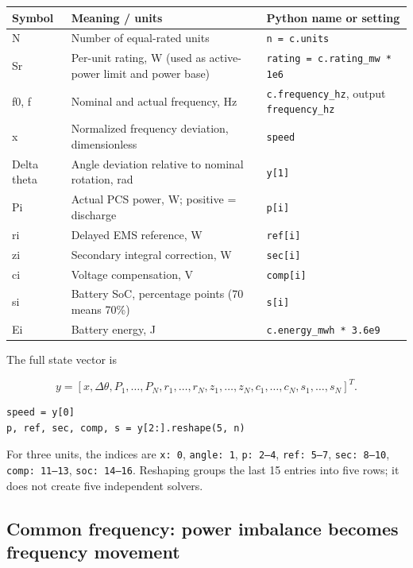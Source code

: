 \documentclass[11pt,a4paper]{article}
\begin{document}
\begingroup\small
\setlength{\tabcolsep}{3pt}
\begin{longtable}{p{}p{}p{}}
\toprule
Symbol & Meaning / units & Python name or setting \\
\midrule\endhead
N & Number of equal-rated units & \texttt{n = c.units} \\
Sr & Per-unit rating, W (used as active-power limit and power base) & \texttt{rating = c.rating\_mw * 1e6} \\
f0, f & Nominal and actual frequency, Hz & \texttt{c.frequency\_hz}, output \texttt{frequency\_hz} \\
x & Normalized frequency deviation, dimensionless & \texttt{speed} \\
Delta theta & Angle deviation relative to nominal rotation, rad & \texttt{y[1]} \\
Pi & Actual PCS power, W; positive = discharge & \texttt{p[i]} \\
ri & Delayed EMS reference, W & \texttt{ref[i]} \\
zi & Secondary integral correction, W & \texttt{sec[i]} \\
ci & Voltage compensation, V & \texttt{comp[i]} \\
si & Battery SoC, percentage points (70 means 70\%) & \texttt{s[i]} \\
Ei & Battery energy, J & \texttt{c.energy\_mwh * 3.6e9} \\
\bottomrule
\end{longtable}
\endgroup

The full state vector is

\[
y=[x,\Delta\theta,P_1,\ldots,P_N,r_1,\ldots,r_N,z_1,\ldots,z_N,c_1,\ldots,c_N,s_1,\ldots,s_N]^T.
\]

\begin{lstlisting}
speed = y[0]
p, ref, sec, comp, s = y[2:].reshape(5, n)
\end{lstlisting}

For three units, the indices are \texttt{x: 0}, \texttt{angle: 1}, \texttt{p: 2--4}, \texttt{ref: 5--7}, \texttt{sec: 8--10}, \texttt{comp: 11--13}, \texttt{soc: 14--16}. Reshaping groups the last 15 entries into five rows; it does not create five independent solvers.

\subsection{Common frequency: power imbalance becomes frequency movement}
\end{document}
